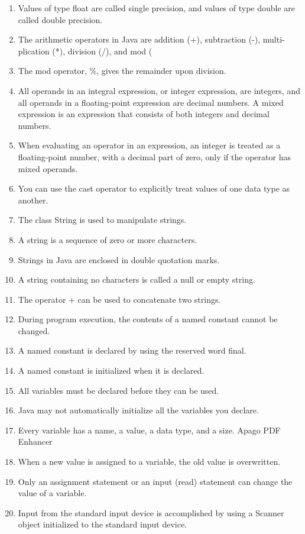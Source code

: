 \documentclass[12pt,a4paper,final,twoside,onecolumn,titlepage]{book}
\begin{document}
\begin{enumerate}
\item Values of type float are called single precision, and values of type double are called double precision.
\item The arithmetic operators in Java are addition (+), subtraction (-), multi- plication (*), division (/), and mod (%
\item The mod operator, \%, gives the remainder upon division.
\item All operands in an integral expression, or integer expression, are integers, and all operands in a floating-point expression are decimal numbers.
A mixed expression is an expression that consists of both integers and decimal numbers.
\item When evaluating an operator in an expression, an integer is treated as a floating-point number, with a decimal part of zero, only if the operator has mixed operands.
\item You can use the cast operator to explicitly treat values of one data type as another.
\item The class String is used to manipulate strings.
\item A string is a sequence of zero or more characters.
\item Strings in Java are enclosed in double quotation marks.
\item A string containing no characters is called a null or empty string.
\item The operator + can be used to concatenate two strings.
\item During program execution, the contents of a named constant cannot be changed.
\item A named constant is declared by using the reserved word final.
\item A named constant is initialized when it is declared.
\item All variables must be declared before they can be used.
\item Java may not automatically initialize all the variables you declare.
\item Every variable has a name, a value, a data type, and a size. Apago PDF Enhancer
\item When a new value is assigned to a variable, the old value is overwritten.
\item Only an assignment statement or an input (read) statement can change the value of a variable.
\item Input from the standard input device is accomplished by using a Scanner object initialized to the standard input device.

\end{enumerate}
\end{document}
